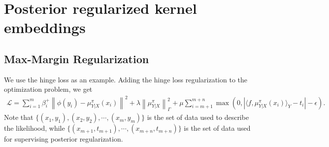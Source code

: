 \documentclass[a4paper]{article}
\renewcommand{\cal}{\mathcal}
\newcommand{\norm}[1]{\left\lVert#1\right\rVert}
\begin{document}
\section{Posterior regularized kernel embeddings}
\subsection{Max-Margin Regularization}
We use the hinge loss as an example. Adding the hinge loss regularization to the optimization problem, we get
\begin{align}
\cal{L} = \sum_{i=1}^{m} \beta_i^+ \norm{\phi(y_i) - \mu_{Y|X}^\pi(x_i)}^2 + \lambda\norm{\mu_{Y|X}^\pi}_\Gamma^2 + \mu \sum_{i=m+1}^{m+n} \max (0, |\langle f, \mu_{Y|X}^\pi(x_i)\rangle_{Y} - t_i| - \epsilon).
\end{align}
Note that $\{(x_1,y_1),(x_2,y_2),\cdots,(x_m,y_m)\}$ is the set of data used to describe the likelihood, while $\{(x_{m+1},t_{m+1}),\cdots,(x_{m+n},t_{m+n}) \}$ is the set of data used for supervising posterior regularization.
\end{document}
